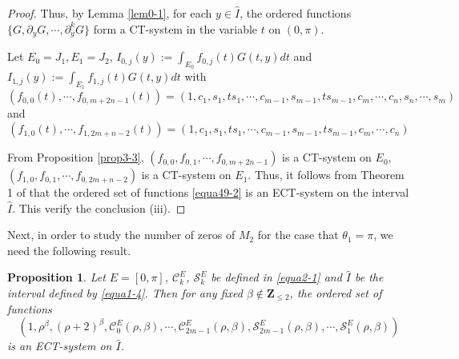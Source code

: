\documentclass[11pt]{amsart}
\newtheorem{prop}[thm]{Proposition}
\theoremstyle{remark}
\theoremstyle{definition}
\begin{document}
\begin{proof}
Thus, by Lemma  \ref{lem0-1}, for each $y\in \hat{I}$, the  ordered functions $\{G,\partial_y G, \cdots,\partial^{k}_y G\}$ form  a CT-system in the variable $t$ on $(0, \pi)$.

Let $E_0=J_1, E_1=J_2$, $I_{0,j}(y):=\int_{E_0}f_{0,j}(t)G(t,y)dt$  and $I_{1,j}(y):=\int_{E_1}f_{1,j}(t)G(t,y)dt$ with
\begin{equation*}\left(f_{0,0}(t),\cdots,f_{0,m+2n-1}(t)\right)=\left(1, c_1, s_1,t s_1, \cdots,   c_{m-1}, s_{m-1}, t s_{m-1},
  c_{m},   \cdots, c_{n}, s_{n},\cdots, s_{m}\right)\end{equation*}
and
\begin{equation*}\left(f_{1,0}(t),\cdots,f_{1,2m+n-2}(t)\right)=\left(1, c_1, s_1, t s_1, \cdots,   c_{m-1}, s_{m-1}, t s_{m-1}, c_m, \cdots, c_{n}\right)\end{equation*}


From Proposition  \ref{prop3-3}, $(f_{0,0}, f_{0,1}, \cdots, f_{0,m+2n-1})$ is a CT-system on $E_0$,  $(f_{1,0}, f_{0,1}, \cdots, f_{0,2m+n-2})$ is a CT-system on $E_1$.
Thus,   it follows from  Theorem 1 of \cite{HLZ2023} that the ordered set of functions
  \eqref{equa49-2} is an ECT-system on the interval  $\hat{I}$. This verify the conclusion (iii).\end{proof}





Next, in order to study the number of zeros of $M_2$ for the case that $\theta_1=\pi$, we need the following result.

\begin{prop} \label{prop3-7} Let $E=[0,\pi]$,  $\mathcal{C}_{k}^{E}$, $\mathcal{S}_{k}^{E}$    be defined in \eqref{equa2-1} and $\hat{I}$ be the   interval   defined by  \eqref{equa1-4}.  Then for any   fixed $\beta \notin \mathbf{Z}_{\leq 2}$,
the ordered set of functions
 \begin{equation} \label{equa60-1}\left(1,\rho^{\beta}, (\rho+2)^{\beta}, \mathcal{C}_{0}^{E}(\rho,\beta), \cdots, \mathcal{C}_{2m-1}^{E}(\rho,\beta), \mathcal{S}_{2m-1}^{E}(\rho,\beta), \cdots, \mathcal{S}_{1}^{E}(\rho,\beta)\right) \end{equation}
is an ECT-system on   $\hat{I}$.
\end{prop}
\end{document}
